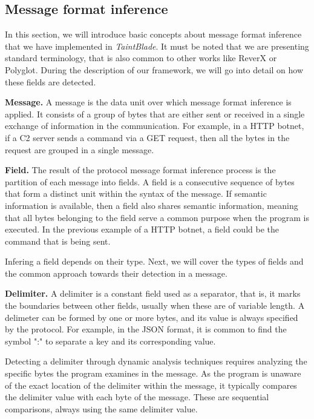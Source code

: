 \documentclass[conference]{IEEEtran}
\begin{document}
\subsection{Message format inference}\label{subsec:msg_format_inference}
In this section, we will introduce basic concepts about message format
inference that we have implemented in \textit{TaintBlade}. It must be noted
that we are presenting standard terminology, that is also common to other works
like ReverX\cite{github_pre_reverx} or Polyglot\cite{polyglot_caballero}.
During the description of our framework, we will go into detail on how these
fields are detected.

\textbf{Message.} A message is the data unit over which message format inference is applied. It
consists of a group of bytes that are either sent or received in a single exchange of information
in the communication. For example, in a HTTP botnet, if a C2 server sends a command via a GET request,
then all the bytes in the request are grouped in a single message.

\textbf{Field.} The result of the protocol message format inference process is the partition of each
message into fields. A field is a consecutive sequence of bytes that form a distinct unit within the syntax of the message.
If semantic information is available, then a field also shares semantic information, meaning that all bytes
belonging to the field serve a common purpose when the program is executed. In the previous example of a HTTP botnet,
a field could be the command that is being sent.

Infering a field depends on their type. Next, we will cover the types of fields
and the common approach towards their detection in a message.

\textbf{Delimiter.} A delimiter is a constant field used as a separator,
that is, it marks the boundaries between other fields, usually when these
are of variable length. A delimeter can be formed by one or more bytes,
and its value is always specified by the protocol.
For example, in the JSON format, it is common to find the symbol ":" to
separate a key and its corresponding value.

Detecting a delimiter through dynamic analysis techniques requires analyzing
the specific bytes the program examines in the message. As the program is
unaware of the exact location of the delimiter within the message, it typically
compares the delimiter value with each byte of the message. These are
sequential comparisons, always using the same delimiter value.
\end{document}

